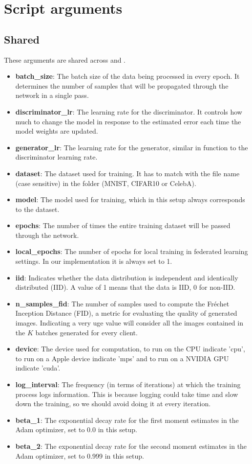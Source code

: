 \chapter{Script arguments} \label{appendix:args}
\section{Shared}
These arguments are shared across  and .
\begin{itemize}
    \item \textbf{batch\_size}: The batch size of the data being processed in every epoch. It determines the number of samples that will be propagated through the network in a single pass.
    \item \textbf{discriminator\_lr}: The learning rate for the discriminator. It controls how much to change the model in response to the estimated error each time the model weights are updated.
    \item \textbf{generator\_lr}: The learning rate for the generator, similar in function to the discriminator learning rate.
    \item \textbf{dataset}: The dataset used for training. It has to match with the file name (case sensitive) in the  folder (MNIST, CIFAR10 or CelebA).
    \item \textbf{model}: The model used for training, which in this setup always corresponds to the dataset.
    \item \textbf{epochs}: The number of times the entire training dataset will be passed through the network.
    \item \textbf{local\_epochs}: The number of epochs for local training in federated learning settings. In our implementation it is always set to 1.
    \item \textbf{iid}: Indicates whether the data distribution is independent and identically distributed (IID). A value of 1 means that the data is IID, 0 for non-IID.
    \item \textbf{n\_samples\_fid}: The number of samples used to compute the Fréchet Inception Distance (FID), a metric for evaluating the quality of generated images. Indicating a very uge value will consider all the images contained in the $K$ batches generated for every client.
    \item \textbf{device}: The device used for computation, to run on the CPU indicate 'cpu', to run on a Apple device indicate 'mps' and to run on a NVIDIA GPU indicate 'cuda'.
    \item \textbf{log\_interval}: The frequency (in terms of iterations) at which the training process logs information. This is because logging could take time and slow down the training, so we should avoid doing it at every iteration.
    \item \textbf{beta\_1}: The exponential decay rate for the first moment estimates in the Adam optimizer, set to 0.0 in this setup.
    \item \textbf{beta\_2}: The exponential decay rate for the second moment estimates in the Adam optimizer, set to 0.999 in this setup.
\end{itemize}


